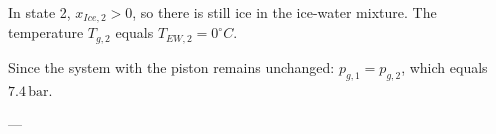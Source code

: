 In state 2, \( x_{Ice,2} > 0 \), so there is still ice in the ice-water mixture.  
The temperature \( T_{g,2} \) equals \( T_{EW,2} = 0^\circ C \).  

Since the system with the piston remains unchanged:  
\( p_{g,1} = p_{g,2} \), which equals \( 7.4 \, \text{bar} \).  

---